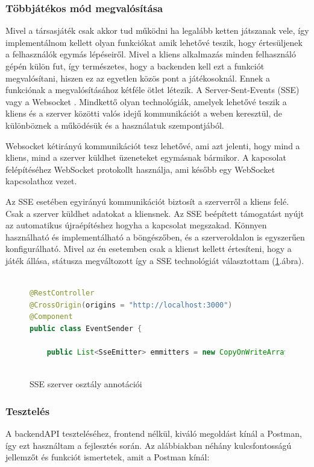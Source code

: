 \documentclass[a4paper,twoside]{article}
\begin{document}
\subsubsection{Többjátékos mód megvalósítása}\label{tobbjatekos}
Mivel a társasjáték csak akkor tud működni ha legalább ketten játszanak vele, így implementálnom kellett olyan funkciókat amik lehetővé teszik, hogy értesüljenek 
a felhasználók egymás lépéseiről. Mivel a kliens alkalmazás minden felhasználó gépén külön fut, így természetes, hogy a backenden kell ezt a funkciót megvalósítani, hiszen ez az egyetlen közös pont a játékosoknál. Ennek a funkciónak a megvalósításához kétféle ötlet létezik. A Server-Sent-Events (SSE) \cite{sse} vagy a Websocket \cite{websocket}. Mindkettő olyan technológiák, amelyek lehetővé teszik a kliens és a szerver közötti valós idejű kommunikációt a weben keresztül, de különböznek a működésük és a használatuk szempontjából.

Websocket kétirányú kommunikációt tesz lehetővé, ami azt jelenti, hogy mind a kliens, mind a szerver küldhet üzeneteket egymásnak bármikor. A kapcsolat felépítéséhez WebSocket protokollt használja, ami később egy WebSocket kapcsolathoz vezet.
 
Az SSE esetében egyirányú kommunikációt biztosít a szerverről a kliens felé. Csak a szerver küldhet adatokat a kliensnek. Az SSE beépített támogatást nyújt az automatikus újraépítéshez hogyha a kapcsolat megszakad. Könnyen használható és implementálható a böngészőben, és a szerveroldalon is egyszerűen konfigurálható. Mivel az én esetemben csak a klienst kellett értesíteni, hogy a játék állása, státusza megváltozott így a SSE technológiát választottam (\ref{sse}.ábra). 
\begin{figure}
	\caption{SSE szerver osztály annotációi}
	\centering
	\begin{lstlisting}[language=java,breaklines=true]
		
@RestController
@CrossOrigin(origins = "http://localhost:3000")
@Component
public class EventSender {
		
	public List<SseEmitter> emmitters = new CopyOnWriteArrayList<SseEmitter>();
		
	\end{lstlisting}
	\label{sse}
\end{figure} 
\subsubsection{Tesztelés}
A backendAPI teszteléséhez, frontend nélkül, kiváló megoldást kínál a Postman\cite{postman}, így ezt használtam a fejlesztés során. Az alábbiakban néhány kulcsfontosságú jellemzőt és funkciót ismertetek, amit a Postman kínál:
\end{document}
